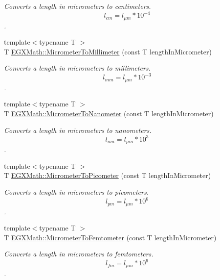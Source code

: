 \begin{DoxyCompactItemize}
\begin{DoxyCompactList}\small\item\em Converts a length in micrometers to centimeters. \[ l_{cm}=l_{\mu m} * 10^{-4} \]. \end{DoxyCompactList}\item 
{\footnotesize template$<$typename T $>$ }\\T \mbox{\hyperlink{group___e_g_x_math-_conversions-_length_conversions-_micrometer-_s_i_ga3c5ef053f2554257486e8633840d8ad6}{E\+G\+X\+Math\+::\+Micrometer\+To\+Millimeter}} (const T length\+In\+Micrometer)
\begin{DoxyCompactList}\small\item\em Converts a length in micrometers to millimeters. \[ l_{mm}=l_{\mu m} * 10^{-3} \]. \end{DoxyCompactList}\item 
{\footnotesize template$<$typename T $>$ }\\T \mbox{\hyperlink{group___e_g_x_math-_conversions-_length_conversions-_micrometer-_s_i_gaf8c9401ae0ce0536229d6c24894d30bc}{E\+G\+X\+Math\+::\+Micrometer\+To\+Nanometer}} (const T length\+In\+Micrometer)
\begin{DoxyCompactList}\small\item\em Converts a length in micrometers to nanometers. \[ l_{nm}=l_{\mu m} * 10^{3} \]. \end{DoxyCompactList}\item 
{\footnotesize template$<$typename T $>$ }\\T \mbox{\hyperlink{group___e_g_x_math-_conversions-_length_conversions-_micrometer-_s_i_ga912ed4989391eeb5d25f43e99108502e}{E\+G\+X\+Math\+::\+Micrometer\+To\+Picometer}} (const T length\+In\+Micrometer)
\begin{DoxyCompactList}\small\item\em Converts a length in micrometers to picometers. \[ l_{pm}=l_{\mu m} * 10^{6} \]. \end{DoxyCompactList}\item 
{\footnotesize template$<$typename T $>$ }\\T \mbox{\hyperlink{group___e_g_x_math-_conversions-_length_conversions-_micrometer-_s_i_gab60084517b51f3138b70e4af762dc4ea}{E\+G\+X\+Math\+::\+Micrometer\+To\+Femtometer}} (const T length\+In\+Micrometer)
\begin{DoxyCompactList}\small\item\em Converts a length in micrometers to femtometers. \[ l_{fm}=l_{\mu m} * 10^{9} \]. \end{DoxyCompactList}\item 

\end{DoxyCompactItemize}
